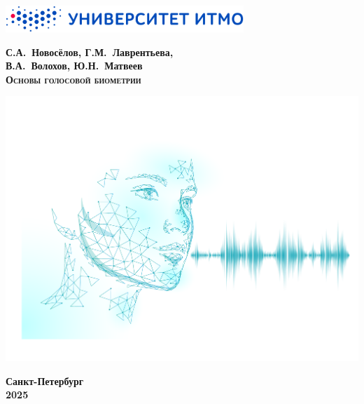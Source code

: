 \documentclass[crop=false]{standalone}
\begin{document}
\begin{center}

\thispagestyle{empty}

\includegraphics[width=9cm]{images/cover/logo_color.png}

\vspace{3.1cm}

\textbf{\LARGE{С.А.~Новосёлов, Г.М.~Лаврентьева, \\ В.А.~Волохов, Ю.Н.~Матвеев}} \\ [3ex]

\textsc{\textbf{\LARGE{Основы голосовой биометрии}}}

\vspace{2.8cm}

\includegraphics[width=15cm]{images/cover/cover.png}

\vspace{2.8cm}

\textbf{\large{Санкт-Петербург}} \\ [2ex]
\textbf{\large{2025}}

\end{center}
\end{document}
